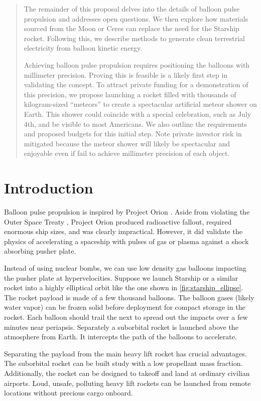 \documentclass{article}
\begin{document}
\begin{abstract}
The remainder of this proposal delves into the details of balloon pulse propulsion and addresses open questions. We then explore how materials sourced from the Moon or Ceres can replace the need for the Starship rocket. Following this, we describe methods to generate clean terrestrial electricity from balloon kinetic energy. 

Achieving balloon pulse propulsion requires positioning the balloons with millimeter precision.  Proving this is feasible is a likely first step in validating the concept.    To attract private funding for a demonstration of this precision, we propose launching a rocket filled with thousands of kilogram-sized “meteors” to create a spectacular artificial meteor shower on Earth. This shower could coincide with a special celebration, such as July 4th, and be visible to most Americans. We also outline the requirements and proposed budgets for this initial step.   Note private investor risk in mitigated because the meteor shower will likely be spectacular and enjoyable even if fail to achieve millimeter precision of each object.   

\end{abstract}


\section{Introduction}
Balloon pulse propulsion is inspired by Project Orion \cite{projorion}.   Aside from violating the Outer Space Treaty \cite{outer_space_treaty}, Project Orion produced radioactive fallout, required enormous ship sizes, and was clearly impractical.   However, it did validate the physics of accelerating a spaceship with pulses of gas or plasma against a shock absorbing pusher plate. 




Instead of using nuclear bombs, we can use low density gas balloons impacting the pusher plate at hypervelocities.   Suppose we launch Starship or a similar rocket into a highly elliptical orbit like the one shown in \autoref{fig:starship_ellipse}.   The rocket payload is made of a few thousand balloons.   The balloon gases (likely water vapor) can be frozen solid before deployment for compact storage in the rocket.    Each balloon should trail the next to spread out the impacts over a few minutes near  periapsis.   Separately a suborbital rocket is launched above the atmosphere from Earth.   It intercepts the path of the balloons to accelerate. 

Separating the payload from the main heavy lift rocket has crucial advantages.   The suborbital rocket can be built study with a low propellant mass fraction.   Additionally, the rocket can be designed to takeoff and land at ordinary civilian airports.   Loud, unsafe, polluting heavy lift rockets can be launched from remote locations without precious cargo onboard.   
\end{document}
